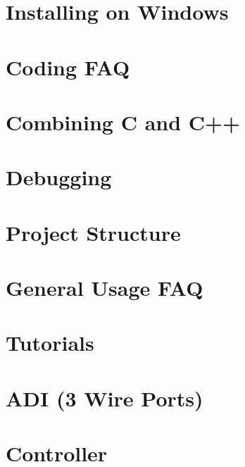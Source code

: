 \documentclass[twoside]{book}
\newcommand{\+}{\discretionary{\mbox{\scriptsize$\hookleftarrow$}}{}{}}
\begin{document}
\chapter{Installing on Windows}
\label{md_docs_getting-started_windows}

\chapter{Coding F\+AQ}
\label{md_docs_tutorials_general_coding-faq}

\chapter{Combining C and C++}
\label{md_docs_tutorials_general_combining-c-cpp}

\chapter{Debugging}
\label{md_docs_tutorials_general_debugging}

\chapter{Project Structure}
\label{md_docs_tutorials_general_project-structure}

\chapter{General Usage F\+AQ}
\label{md_docs_tutorials_general_usage-faq}

\chapter{Tutorials}
\label{md_docs_tutorials_index}

\chapter{A\+DI (3 Wire Ports)}
\label{md_docs_tutorials_topical_adi}

\chapter{Controller}
\label{md_docs_tutorials_topical_controller}

\end{document}
